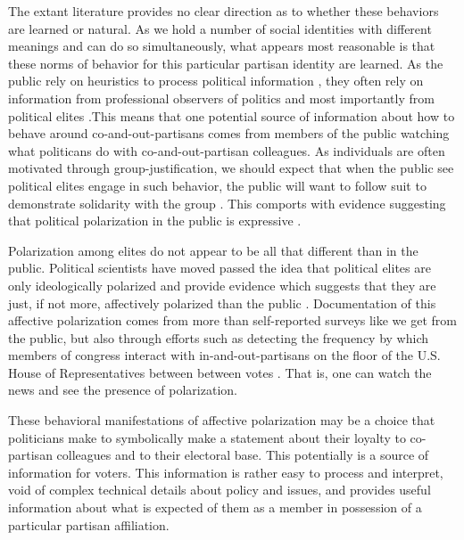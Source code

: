 \documentclass[12pt]{article}
\begin{document}
The extant literature provides no clear direction as to whether these behaviors are learned or natural. As we hold a number of social identities with different meanings and can do so simultaneously, what appears most reasonable is that these norms of behavior for this particular partisan identity are learned. As the public rely on heuristics to process political information \citep{converse_1964}, they often rely on information from professional observers of politics and most importantly from political elites \citep{zaller_1992}.This means that one potential source of information about how to behave around co-and-out-partisans comes from members of the public watching what politicans do with co-and-out-partisan colleagues. As individuals are often motivated through group-justification, we should expect that when the public see political elites engage in such behavior, the public will want to follow suit to demonstrate solidarity with the group \citep{jost_et-al_2022_n}. This comports with evidence suggesting that political polarization in the public is expressive \citep{huddy_et-al_2015_apsr, pickup_et-al_2020}.

Polarization among elites do not appear to be all that different than in the public. Political scientists have moved passed the idea that political elites are only ideologically polarized and provide evidence which suggests that they are just, if not more, affectively polarized than the public \citep{enders_2021}. Documentation of this affective polarization comes from more than self-reported surveys like we get from the public, but also through efforts such as detecting the frequency by which members of congress interact with in-and-out-partisans on the floor of the U.S. House of Representatives between between votes \citep{dietrich_2021}. That is, one can watch the news and see the presence of polarization.

These behavioral manifestations of affective polarization may be a choice that politicians make to symbolically make a statement about their loyalty to co-partisan colleagues and to their electoral base. This potentially is a source of information for voters. This information is rather easy to process and interpret, void of complex technical details about policy and issues, and provides useful information about what is expected of them as a member in possession of a particular partisan affiliation.
\end{document}
